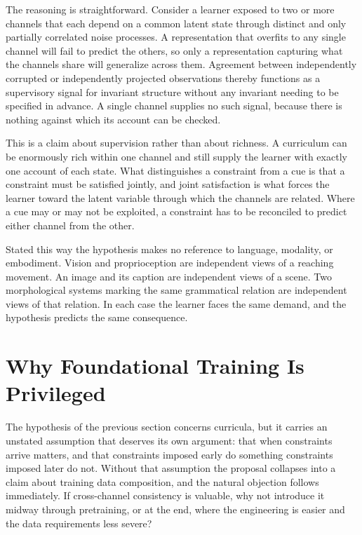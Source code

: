\documentclass[11pt]{article}
\begin{document}
The reasoning is straightforward. Consider a learner exposed to two or more channels that each depend on a common latent state through distinct and only partially correlated noise processes. A representation that overfits to any single channel will fail to predict the others, so only a representation capturing what the channels share will generalize across them. Agreement between independently corrupted or independently projected observations thereby functions as a supervisory signal for invariant structure without any invariant needing to be specified in advance. A single channel supplies no such signal, because there is nothing against which its account can be checked.

This is a claim about supervision rather than about richness. A curriculum can be enormously rich within one channel and still supply the learner with exactly one account of each state. What distinguishes a constraint from a cue is that a constraint must be satisfied jointly, and joint satisfaction is what forces the learner toward the latent variable through which the channels are related. Where a cue may or may not be exploited, a constraint has to be reconciled to predict either channel from the other.

Stated this way the hypothesis makes no reference to language, modality, or embodiment. Vision and proprioception are independent views of a reaching movement. An image and its caption are independent views of a scene. Two morphological systems marking the same grammatical relation are independent views of that relation. In each case the learner faces the same demand, and the hypothesis predicts the same consequence.

\section{Why Foundational Training Is Privileged}
\label{sec:early}

The hypothesis of the previous section concerns curricula, but it carries an unstated assumption that deserves its own argument: that when constraints arrive matters, and that constraints imposed early do something constraints imposed later do not. Without that assumption the proposal collapses into a claim about training data composition, and the natural objection follows immediately. If cross-channel consistency is valuable, why not introduce it midway through pretraining, or at the end, where the engineering is easier and the data requirements less severe?
\end{document}
